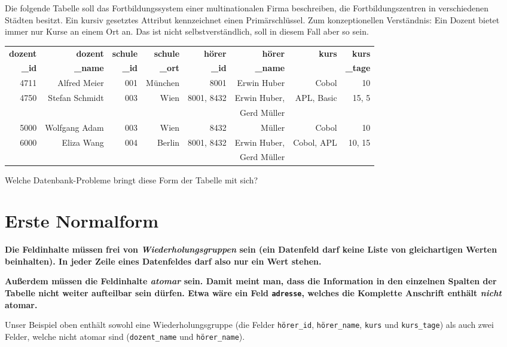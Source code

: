 Die folgende Tabelle soll das Fortbildungssystem einer multinationalen Firma
beschreiben, die Fortbildungszentren in verschiedenen Städten besitzt. Ein
kursiv gesetztes Attribut kennzeichnet einen Primärschlüssel. Zum
konzeptionellen Verständnis: Ein Dozent bietet immer nur Kurse an einem Ort an. Das ist nicht
selbstverständlich, soll in diesem Fall aber so sein.

\begin{tabular}{|r|r|r|r|r|r|r|r|}\hline
\textbf{dozent} & \textbf{dozent} & \textbf{schule} &
\textbf{schule} & \textbf{hörer} & \textbf{hörer} &
\textbf{kurs} & \textbf{kurs}\\
\textbf{\_id} & \textbf{\_name} & \textbf{\_id} &
\textbf{\_ort} & \textbf{\_id} & \textbf{\_name} &
 & \textbf{\_tage}\\
\hline
4711 & Alfred Meier & 001 & München & 8001 & Erwin Huber & Cobol & 10\\ \hline
4750 & Stefan Schmidt & 003 & Wien & 8001, 8432 & Erwin Huber, & APL,
Basic & 15, 5\\
& & & & & Gerd Müller & & \\ \hline
5000 & Wolfgang Adam & 003 & Wien & 8432 & Müller & Cobol & 10\\ \hline
6000 & Eliza Wang & 004 & Berlin & 8001, 8432 & Erwin Huber,& Cobol, APL
& 10, 15\\
& & & & & Gerd Müller & & \\ \hline
\end{tabular}

Welche Datenbank-Probleme bringt diese Form der Tabelle mit sich?


\section{Erste Normalform}

\textbf{Die Feldinhalte müssen frei von \emph{Wiederholungsgruppen} sein (ein
Datenfeld darf keine Liste von gleichartigen Werten beinhalten).
In jeder Zeile eines Datenfeldes darf also nur ein Wert stehen.}

\textbf{Außerdem müssen die Feldinhalte \emph{atomar} sein. Damit meint man,
dass die Information in den einzelnen Spalten der Tabelle nicht weiter
aufteilbar sein dürfen. Etwa wäre ein Feld \lstinline|adresse|, welches die
Komplette Anschrift enthält \emph{nicht} atomar.}

Unser Beispiel oben enthält sowohl eine Wiederholungsgruppe (die Felder
\lstinline|hörer_id|, \lstinline|hörer_name|, \lstinline|kurs| und
\lstinline|kurs_tage|) als auch zwei Felder, welche nicht atomar sind
(\lstinline|dozent_name| und \lstinline|hörer_name|).

